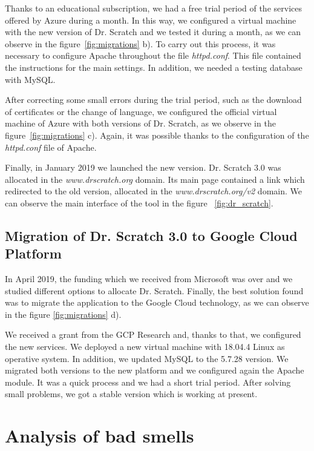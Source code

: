 Thanks to an educational subscription, we had a free trial period of the services offered by Azure during a month. In this way, we configured a virtual machine with the new version of Dr. Scratch and we tested it during a month, as we can observe in the figure~\ref{fig:migrations} b). To carry out this process, it was necessary to configure Apache throughout the file \textit{httpd.conf}. This file contained the instructions for the main settings. In addition, we needed a testing database with MySQL.

After correcting some small errors during the trial period, such as the download of certificates or the change of language,  we configured the official virtual machine of Azure with both versions of Dr. Scratch, as we observe in the figure~\ref{fig:migrations} c). Again, it was possible thanks to the configuration of the \textit{httpd.conf} file of Apache. 

Finally, in January 2019 we launched the new version. Dr. Scratch 3.0 was allocated in the \textit{www.drscratch.org} domain. Its main page contained a link which redirected to the old version, allocated in the \textit{www.drscratch.org/v2} domain. We can observe the main interface of the tool in the figure ~\ref{fig:dr_scratch}.


\subsection{Migration of Dr. Scratch 3.0 to Google Cloud Platform}
\label{subsec:mig_to_google}

In April 2019, the funding which we received from Microsoft was over and we studied different options to allocate Dr. Scratch. Finally, the best solution found was to migrate the application to the Google Cloud technology, as we can observe in the figure \ref{fig:migrations} d).
 
We received a grant from the GCP Research and, thanks to that, we configured the new services. We deployed a new virtual machine with 18.04.4 Linux as operative system. In addition, we updated MySQL to the 5.7.28 version. We migrated both versions to the new platform and we configured again the Apache module. It was a quick process and we had a short trial period. After solving small problems, we got a stable version which is working at present.


\section{Analysis of bad smells}
\label{sec:analysis}

